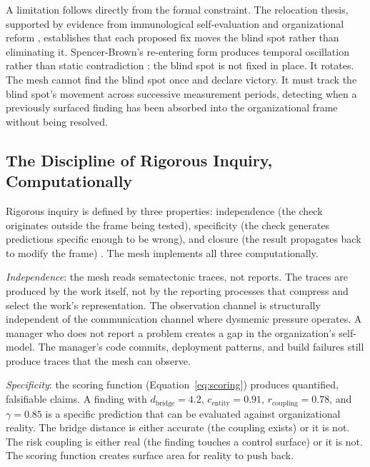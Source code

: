 \documentclass[11pt,a4paper]{article}
\begin{document}
A limitation follows directly from the formal constraint. The relocation thesis, supported by evidence from immunological self-evaluation and organizational reform \citep{mcentire2025a}, establishes that each proposed fix moves the blind spot rather than eliminating it. Spencer-Brown's re-entering form produces temporal oscillation rather than static contradiction \citep{spencerbrown1969}: the blind spot is not fixed in place. It rotates. The mesh cannot find the blind spot once and declare victory. It must track the blind spot's movement across successive measurement periods, detecting when a previously surfaced finding has been absorbed into the organizational frame without being resolved.


\subsection{The Discipline of Rigorous Inquiry, Computationally}
\label{sec:rigorous-inquiry}

Rigorous inquiry is defined by three properties: independence (the check originates outside the frame being tested), specificity (the check generates predictions specific enough to be wrong), and closure (the result propagates back to modify the frame) \citep{mcentire2026}. The mesh implements all three computationally.

\emph{Independence}: the mesh reads sematectonic traces, not reports. The traces are produced by the work itself, not by the reporting processes that compress and select the work's representation. The observation channel is structurally independent of the communication channel where dysmemic pressure operates. A manager who does not report a problem creates a gap in the organization's self-model. The manager's code commits, deployment patterns, and build failures still produce traces that the mesh can observe.

\emph{Specificity}: the scoring function (Equation~\ref{eq:scoring}) produces quantified, falsifiable claims. A finding with $d_{\text{bridge}} = 4.2$, $c_{\text{entity}} = 0.91$, $r_{\text{coupling}} = 0.78$, and $\gamma = 0.85$ is a specific prediction that can be evaluated against organizational reality. The bridge distance is either accurate (the coupling exists) or it is not. The risk coupling is either real (the finding touches a control surface) or it is not. The scoring function creates surface area for reality to push back.
\end{document}
